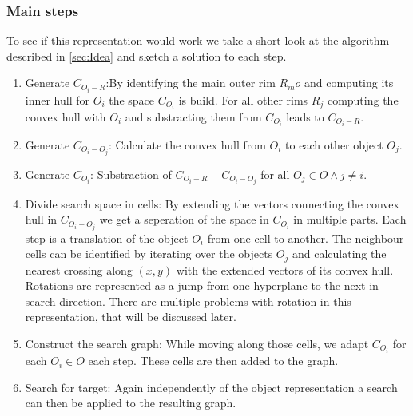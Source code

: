 \subsubsection{Main steps}
To see if this representation would work we take a short look at the algorithm described in \ref{sec:Idea} and sketch a solution to each step.
\begin{enumerate}
\item Generate $C_{O_i-R}$:By identifying the main outer rim $R_mo$ and computing its inner hull for $O_i$ the space $C_{O_i}$ is build. For all other rims $R_j$ computing the convex hull with $O_i$ and substracting them from $C_{O_i}$ leads to $C_{O_i-R}$.
\item Generate $C_{O_i-O_j}$: Calculate the convex hull from $O_i$ to each other object $O_j$.
\item Generate $C_{O_i}$: Substraction of $C_{O_i-R} - C_{O_i-O_j}$ for all $O_j \in O \wedge j \neq i$.
\item Divide search space in cells: By extending the vectors connecting the convex hull in $C_{O_i-O_j}$ we get a seperation of the space in $C_{O_i}$ in multiple parts. Each step is a translation of the object $O_i$  from one cell to another. The neighbour cells can be identified by iterating over the objects $O_j$ and calculating the nearest crossing along $(x,y)$ with the extended vectors of its convex hull. \\ Rotations are represented as a jump from one hyperplane to the next in search direction. There are multiple problems with rotation in this representation, that will be discussed later.
\item Construct the search graph: While moving along those cells, we adapt $C_{O_i}$ for each $O_i \in O$ each step. These cells are then added to the graph.
\item Search for target: Again independently of the object representation a search can then be applied to the resulting graph. 
\end{enumerate}


